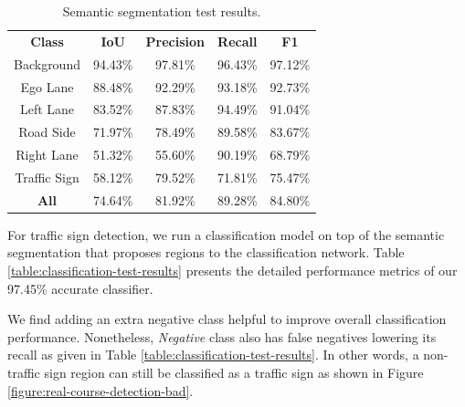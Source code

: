 \begin{table}[h]
  \begin{center}
    \caption[Semantic segmentation test results]{Semantic segmentation
      test results.}
    \label{table:semantic-segmentation-test-results}
    \begin{tabular}{|c|c|c|c|c|}
      \hline
      \textbf{Class} & \textbf{IoU} & \textbf{Precision} & \textbf{Recall} & \textbf{F1}  \\
      Background     & 94.43\%      & 97.81\%            & 96.43\%         & 97.12\%      \\
      Ego Lane       & 88.48\%      & 92.29\%            & 93.18\%         & 92.73\%      \\
      Left Lane      & 83.52\%      & 87.83\%            & 94.49\%         & 91.04\%      \\
      Road Side      & 71.97\%      & 78.49\%            & 89.58\%         & 83.67\%      \\
      Right Lane     & 51.32\%      & 55.60\%            & 90.19\%         & 68.79\%      \\
      Traffic Sign   & 58.12\%      & 79.52\%            & 71.81\%         & 75.47\%      \\
      \hline
      \textbf{All}   & 74.64\%      & 81.92\%            & 89.28\%         & 84.80\%      \\
      \hline
    \end{tabular}
  \end{center}
\end{table}

For traffic sign detection, we run a classification model on top of the
semantic segmentation that proposes regions to the classification
network. Table \ref{table:classification-test-results} presents the detailed
performance metrics of our 97.45\% accurate classifier.

We find adding an extra negative class helpful to improve overall
classification performance. Nonetheless, \textit{Negative} class also has false
negatives lowering its recall as given in Table
\ref{table:classification-test-results}. In other words, a non-traffic sign
region can still be classified as a traffic sign as shown in Figure
\ref{figure:real-course-detection-bad}.

